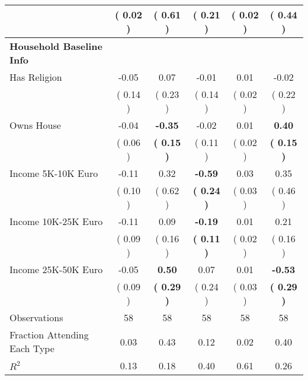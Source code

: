 \begin{table}[H]
{\begin{tabular}{lccccc}
\quad  & (     0.02 ) & (     0.61 )  & (     0.21 )  & (     0.02 ) & (     0.44 ) \\
\midrule
\textbf{Household Baseline Info} \\
\quad Has Religion &     -0.05 &      0.07 &     -0.01 &      0.01 &     -0.02 \\
\quad  & (     0.14 ) & (     0.23 )  & (     0.14 )  & (     0.02 ) & (     0.22 ) \\
\quad Owns House &     -0.04 & \textbf{    -0.35} &     -0.02 &      0.01 & \textbf{     0.40} \\
\quad  & (     0.06 ) & \textbf{(     0.15 )}  & (     0.11 )  & (     0.02 ) & \textbf{(     0.15 )} \\
\quad Income 5K-10K Euro &     -0.11 &      0.32 & \textbf{    -0.59} &      0.03 &      0.35 \\
\quad  & (     0.10 ) & (     0.62 )  & \textbf{(     0.24 )}  & (     0.03 ) & (     0.46 ) \\
\quad Income 10K-25K Euro &     -0.11 &      0.09 & \textbf{    -0.19} &      0.01 &      0.21 \\
\quad  & (     0.09 ) & (     0.16 )  & \textbf{(     0.11 )}  & (     0.02 ) & (     0.16 ) \\
\quad Income 25K-50K Euro &     -0.05 & \textbf{     0.50} &      0.07 &      0.01 & \textbf{    -0.53} \\
\quad  & (     0.09 ) & \textbf{(     0.29 )}  & (     0.24 )  & (     0.03 ) & \textbf{(     0.29 )} \\
\midrule
Observations & 58 & 58 & 58 & 58 & 58 \\
Fraction Attending Each Type &      0.03 &      0.43 &      0.12 &      0.02 &      0.40 \\
\midrule
$ R^2$ &      0.13 &      0.18 &      0.40 &      0.61 &      0.26 \\
\bottomrule
\end{tabular}}
\end{table}
